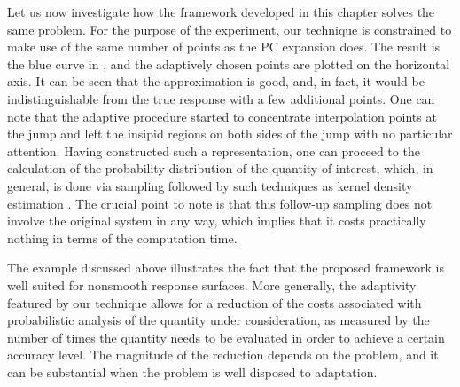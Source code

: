 Let us now investigate how the framework developed in this chapter solves the
same problem. For the purpose of the experiment, our technique is constrained to
make use of the same number of points as the \ac{PC} expansion does. The result
is the blue curve in , and the adaptively chosen points
are plotted on the horizontal axis. It can be seen that the approximation is
good, and, in fact, it would be indistinguishable from the true response with a
few additional points. One can note that the adaptive procedure started to
concentrate interpolation points at the jump and left the insipid regions on
both sides of the jump with no particular attention. Having constructed such a
representation, one can proceed to the calculation of the probability
distribution of the quantity of interest, which, in general, is done via
sampling followed by such techniques as kernel density estimation
\cite{hastie2013}. The crucial point to note is that this follow-up sampling
does not involve the original system in any way, which implies that it costs
practically nothing in terms of the computation time.

The example discussed above illustrates the fact that the proposed framework is
well suited for nonsmooth response surfaces. More generally, the adaptivity
featured by our technique allows for a reduction of the costs associated with
probabilistic analysis of the quantity under consideration, as measured by the
number of times the quantity needs to be evaluated in order to achieve a certain
accuracy level. The magnitude of the reduction depends on the problem, and it
can be substantial when the problem is well disposed to adaptation.
